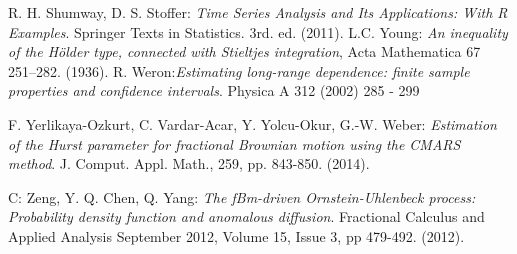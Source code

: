 \documentclass[smallextended]{svjour3}
\begin{document}
\begin{thebibliography}{99}
     R. H. Shumway, D. S. Stoffer: {\it Time Series Analysis and
    Its Applications: With R Examples}.
    Springer Texts in Statistics. 3rd. ed. (2011).
      L.C. Young: {\it An inequality of the H\"older type,
    connected with Stieltjes integration}, Acta Mathematica 67
    251–282. (1936).
     R. Weron:{\it Estimating long-range dependence: finite sample
    properties and confidence intervals}.
    Physica A 312 (2002) 285 - 299

     F. Yerlikaya-Ozkurt, C. Vardar-Acar, Y. Yolcu-Okur, G.-W.
    Weber:
    {\it Estimation of the Hurst parameter for fractional Brownian motion using
    the CMARS method}.
    J. Comput. Appl. Math., 259, pp. 843-850.  (2014).

     C: Zeng, Y. Q. Chen, Q. Yang: {\it The fBm-driven
    Ornstein-Uhlenbeck process: Probability density function and
        anomalous diffusion}. Fractional Calculus and Applied Analysis
        September 2012, Volume 15, Issue 3, pp 479-492. (2012).


\end{thebibliography}
\end{document}
